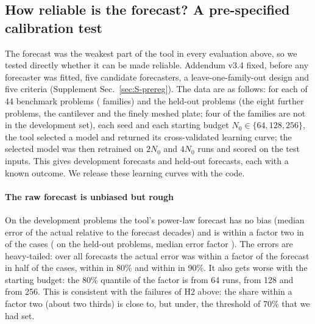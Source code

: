 \subsection{How reliable is the forecast? A pre-specified calibration test}\label{sec:forecast}
The forecast was the weakest part of the tool in every evaluation above, so we tested directly whether it can be made reliable. Addendum v3.4 fixed, before any forecaster was fitted, five candidate forecasters, a leave-one-family-out design and five criteria (Supplement Sec.~\ref{sec:S-prereg}). The data are as follows: for each of 44 benchmark problems (\SfDevFamilies{} families) and the \SfHeldProblems{} held-out problems (the eight further problems, the cantilever and the finely meshed plate; four of the families are not in the development set), each seed and each starting budget $N_0\in\{64,128,256\}$, the tool selected a model and returned its cross-validated learning curve; the selected model was then retrained on $2N_0$ and $4N_0$ runs and scored on the test inputs. This gives \SfDevCases{} development forecasts and \SfHeldCases{} held-out forecasts, each with a known outcome. We release these learning curves with the code.
\paragraph{The raw forecast is unbiased but rough} On the development problems the tool's power-law forecast has no bias (median error of the actual relative to the forecast \SfZeroBiasDev{} decades) and is within a factor two in \SfZeroDevShare{} of the cases (\SfZeroHeldShare{} on the held-out problems, median error factor \SfZeroHeldMed). The errors are heavy-tailed: over all \SfAllCases{} forecasts the actual error was within a factor \SfQHalf{} of the forecast in half of the cases, within \SfQEighty{} in 80\% and within \SfQNinety{} in 90\%. It also gets worse with the starting budget: the 80\% quantile of the factor is \SfPhQEightySixtyfour{} from 64 runs, \SfPhQEightyOnetwentyeight{} from 128 and \SfPhQEightyTwofiftysix{} from 256. This is consistent with the failures of H2 above: the share within a factor two (about two thirds) is close to, but under, the threshold of 70\% that we had set.
